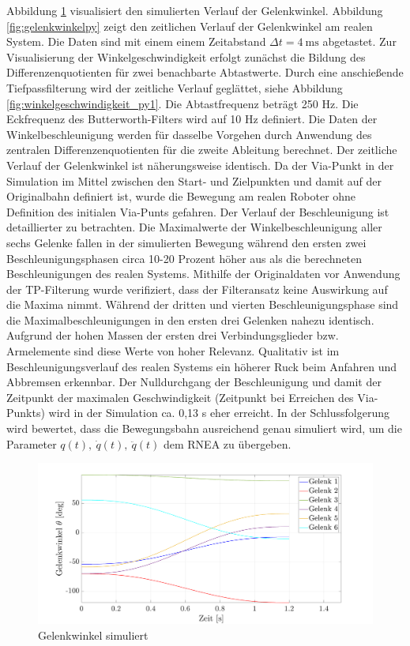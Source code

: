 Abbildung \ref{fig:gelenkwinkel}  visualisiert den simulierten  Verlauf der Gelenkwinkel. Abbildung \ref{fig:gelenkwinkelpy} zeigt den zeitlichen Verlauf der Gelenkwinkel am realen System. Die Daten sind mit einem einem  Zeitabstand $\Delta t = 4~\text{ms}$ abgetastet. Zur Visualisierung der Winkelgeschwindigkeit  erfolgt zunächst die Bildung des Differenzenquotienten für zwei benachbarte Abtastwerte. Durch eine anschießende Tiefpassfilterung wird der zeitliche Verlauf geglättet, siehe Abbildung \ref{fig:winkelgeschwindigkeit_py1}. Die Abtastfrequenz beträgt 250 Hz. Die Eckfrequenz des Butterworth-Filters wird auf 10 Hz definiert. Die Daten der Winkelbeschleunigung werden für dasselbe Vorgehen durch Anwendung des zentralen Differenzenquotienten für die zweite Ableitung berechnet. Der zeitliche Verlauf der Gelenkwinkel ist näherungsweise identisch. Da der Via-Punkt in der Simulation im Mittel zwischen den Start- und Zielpunkten und damit auf der Originalbahn definiert ist, wurde die Bewegung am realen Roboter ohne Definition des initialen Via-Punts gefahren. Der Verlauf der Beschleunigung ist detaillierter zu betrachten. Die Maximalwerte der Winkelbeschleunigung aller sechs Gelenke fallen in der simulierten Bewegung während den ersten zwei Beschleunigungsphasen circa 10-20 Prozent höher aus als die berechneten Beschleunigungen des realen Systems. Mithilfe der Originaldaten vor Anwendung der TP-Filterung wurde verifiziert, dass der Filteransatz keine Auswirkung auf die Maxima nimmt. Während der dritten und vierten Beschleunigungsphase sind die Maximalbeschleunigungen in den ersten drei Gelenken nahezu identisch. Aufgrund der hohen  Massen der ersten drei Verbindungsglieder bzw. Armelemente sind diese Werte von hoher Relevanz. Qualitativ ist im Beschleunigungsverlauf des realen Systems ein höherer Ruck beim Anfahren und Abbremsen erkennbar. Der Nulldurchgang der Beschleunigung und damit der Zeitpunkt der maximalen Geschwindigkeit (Zeitpunkt bei Erreichen des Via-Punkts) wird in der Simulation ca. 0,13 s eher erreicht. In der Schlussfolgerung wird bewertet, dass die Bewegungsbahn ausreichend genau simuliert wird, um die Parameter  $q(t), ~\dot{q}(t), ~\ddot{q}(t)$ dem RNEA zu übergeben. 
%
\newpage
\begin{figure}[]
	\centering
	\includegraphics[width=1\linewidth]{images/posmat}
	\caption{Gelenkwinkel simuliert}
	\label{fig:gelenkwinkel}
\end{figure}
